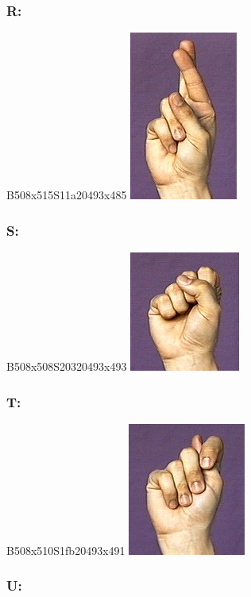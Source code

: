 \documentclass{article}
\begin{document}
\subsubsection{R:}

B508x515S11a20493x485
\includegraphics[scale=0.5]{images/r.jpg}

\subsubsection{S:}

B508x508S20320493x493
\includegraphics[scale=0.5]{images/s.jpg}

\subsubsection{T:}

B508x510S1fb20493x491
\includegraphics[scale=0.5]{images/t.jpg}

\subsubsection{U:}
\end{document}
